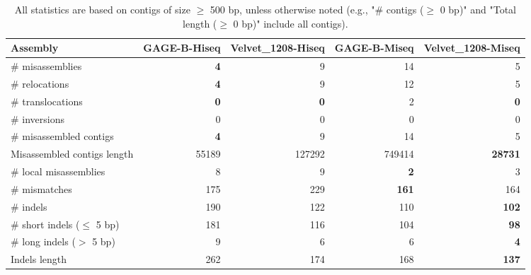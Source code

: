 \documentclass[12pt,a4paper]{article}
\begin{document}
\begin{table}[ht]
\begin{center}
\caption{All statistics are based on contigs of size $\geq$ 500 bp, unless otherwise noted (e.g., "\# contigs ($\geq$ 0 bp)" and "Total length ($\geq$ 0 bp)" include all contigs).}
\begin{tabular}{|l*{4}{|r}|}
\hline
Assembly & GAGE-B-Hiseq & Velvet\_1208-Hiseq & GAGE-B-Miseq & Velvet\_1208-Miseq \\ \hline
\# misassemblies & {\bf 4} & 9 & 14 & 5 \\ \hline
\hspace{5mm}\# relocations & {\bf 4} & 9 & 12 & 5 \\ \hline
\hspace{5mm}\# translocations & {\bf 0} & {\bf 0} & 2 & {\bf 0} \\ \hline
\hspace{5mm}\# inversions & 0 & 0 & 0 & 0 \\ \hline
\# misassembled contigs & {\bf 4} & 9 & 14 & 5 \\ \hline
Misassembled contigs length & 55189 & 127292 & 749414 & {\bf 28731} \\ \hline
\# local misassemblies & 8 & 9 & {\bf 2} & 3 \\ \hline
\# mismatches & 175 & 229 & {\bf 161} & 164 \\ \hline
\# indels & 190 & 122 & 110 & {\bf 102} \\ \hline
\hspace{5mm}\# short indels ($\leq$ 5 bp) & 181 & 116 & 104 & {\bf 98} \\ \hline
\hspace{5mm}\# long indels ($>$ 5 bp) & 9 & 6 & 6 & {\bf 4} \\ \hline
Indels length & 262 & 174 & 168 & {\bf 137} \\ \hline
\end{tabular}
\end{center}
\end{table}
\end{document}
